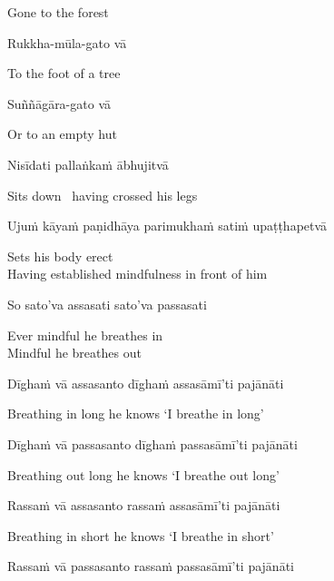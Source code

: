 \begin{cprenglish}
  Gone to the forest
\end{cprenglish}

Rukkha-mūla-gato vā

\begin{cprenglish}
  To the foot of a tree
\end{cprenglish}

Suññāgāra-gato vā

\begin{cprenglish}
  Or to an empty hut
\end{cprenglish}

Nisīdati pallaṅkaṁ ābhujitvā

\begin{cprenglish}
  Sits down \breathmark\ having crossed his legs
\end{cprenglish}

Ujuṁ kāyaṁ paṇidhāya parimukhaṁ satiṁ upaṭṭhapetvā

\begin{cprenglish}
  Sets his body erect\\
  Having established mindfulness in front of him
\end{cprenglish}

So sato'va assasati sato'va passasati

\begin{cprenglish}
  Ever mindful he breathes in\\
  Mindful he breathes out
\end{cprenglish}

Dīghaṁ vā assasanto dīghaṁ assasāmī'ti pajānāti

\begin{cprenglish}
  Breathing in long he knows `I breathe in long'
\end{cprenglish}

Dīghaṁ vā passasanto dīghaṁ passasāmī'ti pajānāti

\begin{cprenglish}
  Breathing out long he knows `I breathe out long'
\end{cprenglish}

Rassaṁ vā assasanto rassaṁ assasāmī'ti pajānāti

\begin{cprenglish}
  Breathing in short he knows `I breathe in short'
\end{cprenglish}

Rassaṁ vā passasanto rassaṁ passasāmī'ti pajānāti

